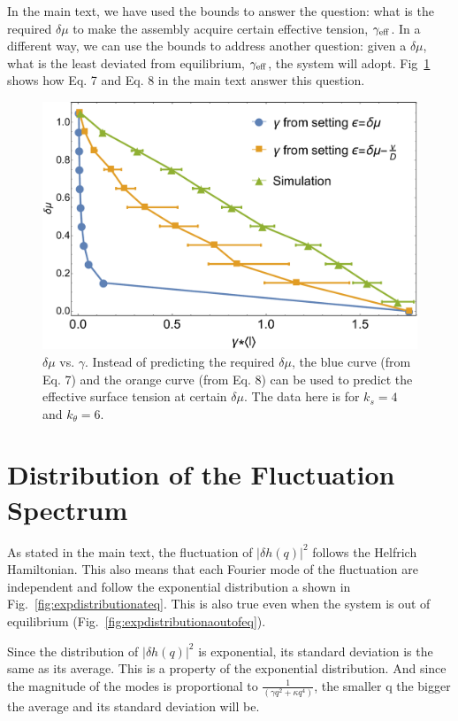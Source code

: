 \documentclass[amsmath,preprintnumbers,10pt,nofootinbib,prl,twocolumn]{revtex4-1}
\begin{document}
In the main text, we have used the bounds to answer the question: what is the required $\delta\mu$ to make the assembly acquire certain effective tension, $\gamma_{\rm{eff}}$. In a different way, we can use the bounds to address another question: given a $\delta\mu$, what is the least deviated from equilibrium, $\gamma_{\rm{eff}}$, the system will adopt. Fig~\ref{fig:epsilonpredict} shows how Eq. 7 and Eq. 8 in the main text answer this question.
\begin{figure}[tbb]
\centering
\includegraphics[scale=0.27]{predictepsilonv2Fig4.pdf}
\caption{$\delta\mu$ vs. $\gamma$. Instead of predicting the required $\delta\mu$, the blue curve (from Eq. 7) and the orange curve (from Eq. 8) can be used to predict the effective surface tension at certain $\delta \mu$. The data here is for $k_s=4$ and $k_\theta = 6$.} \label{fig:epsilonpredict}
\end{figure}
\section{Distribution of the Fluctuation Spectrum}
As stated in the main text, the fluctuation of $|\delta h(q)|^2$ follows the Helfrich Hamiltonian. This also means that each Fourier mode of the fluctuation are independent and follow the exponential distribution a shown in Fig.~\ref{fig:expdistributionateq}. This is also true even when the system is out of equilibrium (Fig.~\ref{fig:expdistributionaoutofeq}).

Since the distribution of $|\delta h(q)|^2$ is exponential, its standard deviation is the same as its average. This is a property of the exponential distribution. And since the magnitude of the modes is proportional to $\frac{1}{(\gamma q^2+\kappa q^4)}$, the smaller q the bigger the average and its standard deviation will be.
\end{document}
